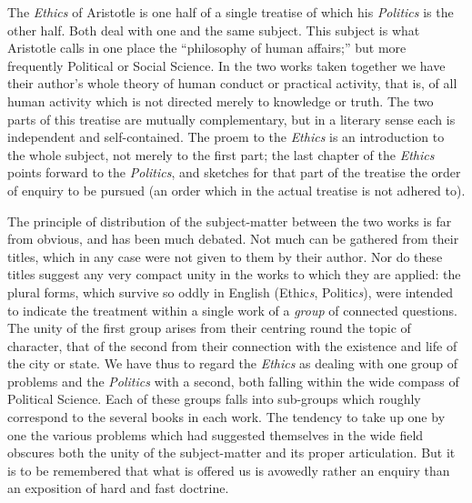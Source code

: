 
The \emph{Ethics} of Aristotle is one half of a single treatise of which his
\emph{Politics} is the other half. Both deal with one and the same subject.
This subject is what Aristotle calls in one place the “philosophy of
human affairs;” but more frequently Political or Social Science. In the
two works taken together we have their author’s whole theory of human
conduct or practical activity, that is, of all human activity which is not
directed merely to knowledge or truth. The two parts of this treatise are
mutually complementary, but in a literary sense each is independent and
self-contained. The proem to the \emph{Ethics} is an introduction to the whole
subject, not merely to the first part; the last chapter of the \emph{Ethics}
points forward to the \emph{Politics}, and sketches for that part of the
treatise the order of enquiry to be pursued (an order which in the actual
treatise is not adhered to).

The principle of distribution of the subject-matter between the two works is
far from obvious, and has been much debated. Not much can be gathered from
their titles, which in any case were not given to them by their author. Nor do
these titles suggest any very compact unity in the works to which they are
applied: the plural forms, which survive so oddly in English (Ethic\emph{s},
Politic\emph{s}), were intended to indicate the treatment within a single work
of a \emph{group} of connected questions. The unity of the first group arises
from their centring round the topic of character, that of the second from their
connection with the existence and life of the city or state. We have thus to
regard the \emph{Ethics} as dealing with one group of problems and the
\emph{Politics} with a second, both falling within the wide compass of
Political Science. Each of these groups falls into sub-groups which roughly
correspond to the several books in each work. The tendency to take up one by
one the various problems which had suggested themselves in the wide field
obscures both the unity of the subject-matter and its proper articulation. But
it is to be remembered that what is offered us is avowedly rather an enquiry
than an exposition of hard and fast doctrine.

